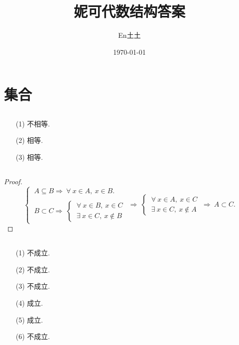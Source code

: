 \documentclass[UTF8]{ctexart}
\title{妮可代数结构答案}
\author{En土土}
\date{\today}
\begin{document}
\fancyfoot[C]{\thepage}

\maketitle
\tableofcontents
\newpage

\section{集合}
\subsection{}   %
\begin{enumerate}
    \item [(1)]不相等.
    \item [(2)]相等.
    \item [(3)]相等.
\end{enumerate}

\subsection{}   %
\begin{proof}
    \[
        \begin{cases}
            \ A \subseteq B \Rightarrow \ \forall\ x\in A,\ x\in B. \\
            \\
            \ B \subset C \Rightarrow
            \ 
            \begin{cases}
                \ \forall\ x\in B,\ x\in C \\
                \ \exists\ x\in C,\ x\notin B
            \end{cases}
        \end{cases}
        \Rightarrow\ 
        \begin{cases}
            \ \forall\ x\in A,\ x\in C\\
            \ \exists\ x\in C,\ x\notin A
        \end{cases}
        \ \Rightarrow\ 
        A \subset C.
    \]
\end{proof}

\subsection{}   %
\begin{enumerate}
    \item [(1)]不成立.
    \item [(2)]不成立.
    \item [(3)]不成立.
    \item [(4)]成立.
    \item [(5)]成立.
    \item [(6)]不成立.
\end{enumerate}
\end{document}

